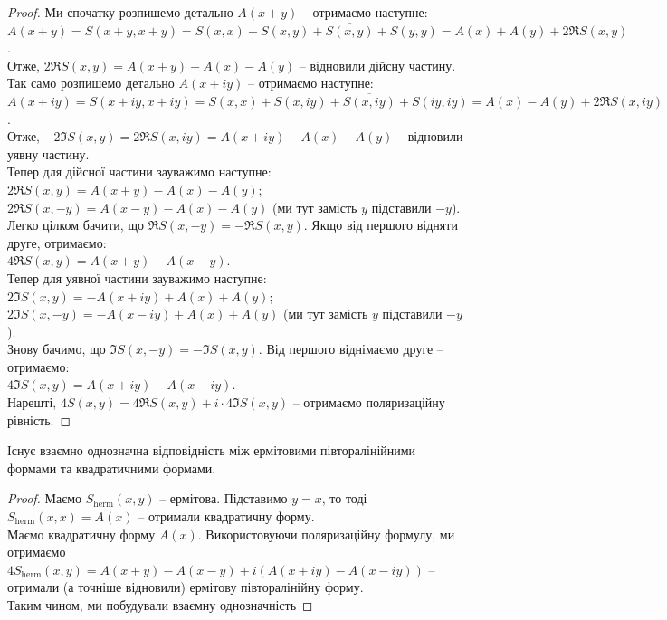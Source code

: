 \documentclass{math_library}
\begin{document}
\begin{proof}
Ми спочатку розпишемо детально $A(x+y)$ -- отримаємо наступне:\\
$A(x+y) = S(x+y,x+y) = S(x,x) + S(x,y) + \overline{S(x,y)} + S(y,y) = A(x) + A(y) + 2 \Re S(x,y)$.\\
Отже, $2 \Re S(x,y) = A(x+y) - A(x) - A(y)$ -- відновили дійсну частину.\\
Так само розпишемо детально $A(x+iy)$ -- отримаємо наступне:\\
$A(x+iy) = S(x+iy,x+iy) = S(x,x) + S(x,iy) + \overline{S(x,iy)} + S(iy,iy) = A(x) - A(y) + 2 \Re S(x,iy)$.\\
Отже, $-2 \Im S(x,y) = 2 \Re S(x,iy) = A(x+iy) - A(x) - A(y)$ -- відновили уявну частину.\\
Тепер для дійсної частини зауважимо наступне:\\
$2 \Re S(x,y) = A(x+y) - A(x) - A(y)$;\\
$2 \Re S(x,-y) = A(x-y) - A(x) - A(y)$ (ми тут замість $y$ підставили $-y$).\\
Легко цілком бачити, що $\Re S(x,-y) = - \Re S(x,y)$. Якщо від першого відняти друге, отримаємо:\\
$4 \Re S(x,y) = A(x+y) - A(x-y)$.\\
Тепер для уявної частини зауважимо наступне:\\
$2 \Im S(x,y) = -A(x+iy) + A(x) + A(y)$;\\
$2 \Im S(x,-y) = -A(x-iy) + A(x) + A(y)$ (ми тут замість $y$ підставили $-y$).\\
Знову бачимо, що $\Im S(x,-y) = - \Im S(x,y)$. Від першого віднімаємо друге -- отримаємо:\\
$4 \Im S(x,y) = A(x+iy) - A(x-iy)$.\\
Нарешті, $4S(x,y) = 4 \Re S(x,y) + i \cdot 4 \Im S(x,y)$ -- отримаємо поляризаційну рівність.
\end{proof}

\begin{theorem}
Існує взаємно однозначна відповідність між ермітовими півторалінійними формами та квадратичними формами.
\end{theorem}

\begin{proof}
Маємо $S_{\text{herm}}(x,y)$ -- ермітова. Підставимо $y = x$, то тоді $S_{\text{herm}}(x,x) = A(x)$ -- отримали квадратичну форму.\\
Маємо квадратичну форму $A(x)$. Використовуючи поляризаційну формулу, ми отримаємо $4S_{\text{herm}}(x,y) = A(x+y) - A(x-y) + i(A(x+iy) - A(x-iy))$ -- отримали (а точніше відновили) ермітову півторалінійну форму. \\
Таким чином, ми побудували взаємну однозначність
\end{proof}
\end{document}

